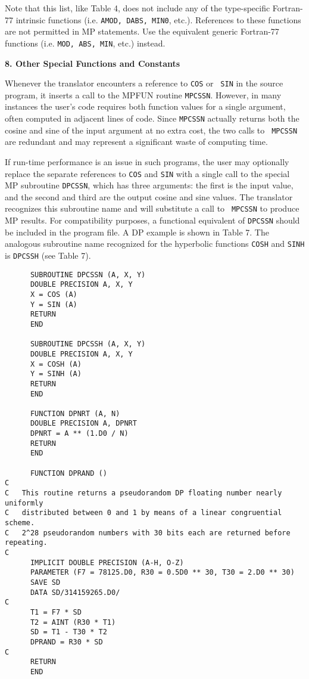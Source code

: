 \noindent
Note that this list, like Table 4, does not include any of the
type-specific Fortran-77 intrinsic functions (i.e. {\tt AMOD, DABS,
MIN0}, etc.).  References to these functions are not permitted in MP
statements.  Use the equivalent generic Fortran-77 functions (i.e.
{\tt MOD, ABS, MIN}, etc.) instead.

\vspace{2ex} \noindent
{\bf 8. Other Special Functions and Constants}
 
Whenever the translator encounters a reference to {\tt COS} or {\tt
SIN} in the source program, it inserts a call to the MPFUN routine
{\tt MPCSSN}.  However, in many instances the user's code requires
both function values for a single argument, often computed in adjacent
lines of code.  Since {\tt MPCSSN} actually returns both the cosine
and sine of the input argument at no extra cost, the two calls to {\tt
MPCSSN} are redundant and may represent a significant waste of
computing time.

If run-time performance is an issue in such programs, the user may
optionally replace the separate references to {\tt COS} and {\tt SIN}
with a single call to the special MP subroutine {\tt DPCSSN}, which
has three arguments: the first is the input value, and the second and
third are the output cosine and sine values.  The translator
recognizes this subroutine name and will substitute a call to {\tt
MPCSSN} to produce MP results.  For compatibility purposes, a
functional equivalent of {\tt DPCSSN} should be included in the
program file.  A DP example is shown in Table 7.  The analogous
subroutine name recognized for the hyperbolic functions {\tt COSH} and
{\tt SINH} is {\tt DPCSSH} (see Table 7).
 
\begin{table}
\begin{tt} \begin{small} \begin{verbatim}
      SUBROUTINE DPCSSN (A, X, Y)
      DOUBLE PRECISION A, X, Y
      X = COS (A)
      Y = SIN (A)
      RETURN
      END

      SUBROUTINE DPCSSH (A, X, Y)
      DOUBLE PRECISION A, X, Y
      X = COSH (A)
      Y = SINH (A)
      RETURN
      END

      FUNCTION DPNRT (A, N)
      DOUBLE PRECISION A, DPNRT
      DPNRT = A ** (1.D0 / N)
      RETURN
      END

      FUNCTION DPRAND ()
C
C   This routine returns a pseudorandom DP floating number nearly uniformly
C   distributed between 0 and 1 by means of a linear congruential scheme.
C   2^28 pseudorandom numbers with 30 bits each are returned before repeating.
C
      IMPLICIT DOUBLE PRECISION (A-H, O-Z)
      PARAMETER (F7 = 78125.D0, R30 = 0.5D0 ** 30, T30 = 2.D0 ** 30)
      SAVE SD
      DATA SD/314159265.D0/
C
      T1 = F7 * SD
      T2 = AINT (R30 * T1)
      SD = T1 - T30 * T2
      DPRAND = R30 * SD
C
      RETURN
      END
\end{verbatim} \end{small} \end{tt}
\caption{Suggested DP Equivalents of {\tt DPCSSN, DPCSSH, DPNRT} and
{\tt DPRAND}}
\end{table}
 
